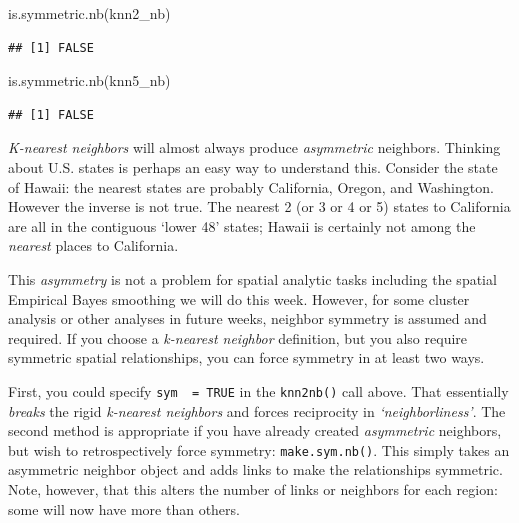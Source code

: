 \documentclass[
]{book}
\newenvironment{Shaded}{\begin{snugshade}}{\end{snugshade}}
\newcommand{\FunctionTok}[1]{\textcolor[rgb]{0.00,0.00,0.00}{#1}}
\newcommand{\NormalTok}[1]{#1}
\newenvironment{rmdnote}[1]
  {
  \begin{itemize}
  \renewcommand{\labelitemi}{
    \raisebox{-.7\height}[0pt][0pt]{
      {\setkeys{Gin}{width=3em,keepaspectratio}\texttt{[image: images/\#1]}}
    }
  }
  \setlength{\fboxsep}{1em}
  \begin{note}
  \item
  }
  {
  \end{note}
  \end{itemize}
  }
\begin{document}
\begin{Shaded}
\begin{Highlighting}[]
\FunctionTok{is.symmetric.nb}\NormalTok{(knn2\_nb)}
\end{Highlighting}
\end{Shaded}

\begin{verbatim}
## [1] FALSE
\end{verbatim}

\begin{Shaded}
\begin{Highlighting}[]
\FunctionTok{is.symmetric.nb}\NormalTok{(knn5\_nb)}
\end{Highlighting}
\end{Shaded}

\begin{verbatim}
## [1] FALSE
\end{verbatim}

\begin{rmdnote}{note}
\emph{K-nearest neighbors} will almost always produce \emph{asymmetric} neighbors. Thinking about U.S. states is perhaps an easy way to understand this. Consider the state of Hawaii: the nearest states are probably California, Oregon, and Washington. However the inverse is not true. The nearest 2 (or 3 or 4 or 5) states to California are all in the contiguous `lower 48' states; Hawaii is certainly not among the \emph{nearest} places to California.

\end{rmdnote}

This \emph{asymmetry} is not a problem for spatial analytic tasks including the spatial Empirical Bayes smoothing we will do this week. However, for some cluster analysis or other analyses in future weeks, neighbor symmetry is assumed and required. If you choose a \emph{k-nearest neighbor} definition, but you also require symmetric spatial relationships, you can force symmetry in at least two ways.

First, you could specify \texttt{sym\ \ =\ TRUE} in the \texttt{knn2nb()} call above. That essentially \emph{breaks} the rigid \emph{k-nearest neighbors} and forces reciprocity in \emph{`neighborliness'}. The second method is appropriate if you have already created \emph{asymmetric} neighbors, but wish to retrospectively force symmetry: \texttt{make.sym.nb()}. This simply takes an asymmetric neighbor object and adds links to make the relationships symmetric. Note, however, that this alters the number of links or neighbors for each region: some will now have more than others.
\end{document}

